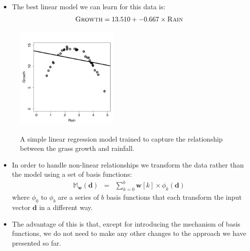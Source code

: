 \documentclass[xcolor={table}]{beamer}
\newcommand{\featN}[1]{\textsc{#1}}
\begin{document}
 \begin{frame} 
 \begin{itemize}
 \item The best linear model we can learn for this data is: 
\begin{eqnarray*}
	\featN{Growth} = 13.510 + -0.667 \times \featN{Rain}
\end{eqnarray*}
 \end{itemize}
\begin{figure}
\begin{center}
\label{fig:grassGrowthLinearModel}\includegraphics[width=0.45\textwidth]{./images/grassGrowthLinearModel.pdf}
\caption{A simple linear regression model trained to capture the relationship between the grass growth and rainfall.}
\label{fig:grassGrowth}
\end{center}
\end{figure}
\end{frame} 

\begin{frame}
\begin{itemize}
	\item In order to handle non-linear relationships we transform the data rather than the model using a set of basis functions:
\begin{eqnarray}
\mathbb{M}_{\mathbf{w}}(\mathbf{d}) & = & \sum_{k=0}^{b} \mathbf{w}[k]\times\phi_k(\mathbf{d})
\label{eqn:multiVariateRegressionWithBasisFunctions}
\end{eqnarray}
\noindent where $\phi_0$ to $\phi_b$ are a series of $b$ basis functions that each transform the input vector $\mathbf{d}$ in a different way. 
\item The advantage of this is that, except for introducing the mechanism of basis functions, we do not need to make any other changes to the approach we have presented so far. 
\end{itemize}
\end{frame} 
\end{document}
